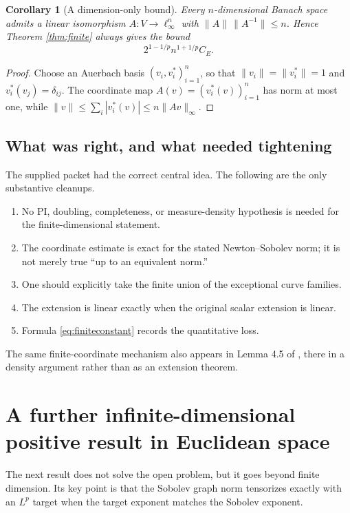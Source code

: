 \documentclass[11pt]{article}
\newtheorem{corollary}[theorem]{Corollary}
\theoremstyle{remark}
\begin{document}
\begin{corollary}[A dimension-only bound]
Every $n$-dimensional Banach space admits a linear isomorphism
$A:V\to\ell_\infty^n$ with
$\|A\|\,\|A^{-1}\|\le n$.  Hence Theorem \ref{thm:finite} always gives the
bound
\[
  2^{1-1/p}n^{1+1/p}C_E.
\]
\end{corollary}

\begin{proof}
Choose an Auerbach basis $(v_i,v_i^*)_{i=1}^n$, so that
$\|v_i\|=\|v_i^*\|=1$ and $v_i^*(v_j)=\delta_{ij}$.  The coordinate map
$A(v)=(v_i^*(v))_{i=1}^n$ has norm at most one, while
$\|v\|\le\sum_i|v_i^*(v)|\le n\|Av\|_\infty$.
\end{proof}

\subsection*{What was right, and what needed tightening}

The supplied packet had the correct central idea.  The following are the
only substantive cleanups.
\begin{enumerate}[leftmargin=2em,itemsep=3pt]
  \item No PI, doubling, completeness, or measure-density hypothesis is
  needed for the finite-dimensional statement.
  \item The coordinate estimate is exact for the stated Newton--Sobolev
  norm; it is not merely true ``up to an equivalent norm.''
  \item One should explicitly take the finite union of the exceptional
  curve families.
  \item The extension is linear exactly when the original scalar extension
  is linear.
  \item Formula \eqref{eq:finiteconstant} records the quantitative loss.
\end{enumerate}
The same finite-coordinate mechanism also appears in Lemma 4.5 of
\cite{GBIZ23}, there in a density argument rather than as an extension
theorem.

\section{A further infinite-dimensional positive result in Euclidean space}

The next result does not solve the open problem, but it goes beyond finite
dimension.  Its key point is that the Sobolev graph norm tensorizes exactly
with an $L^p$ target when the target exponent matches the Sobolev exponent.
\end{document}
